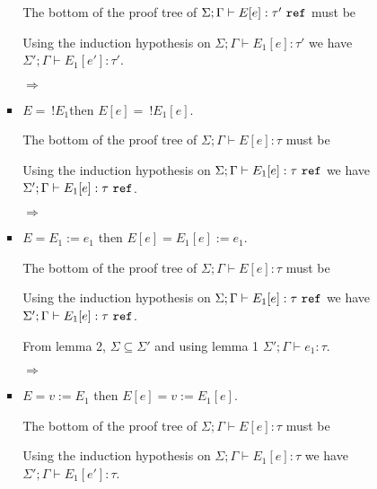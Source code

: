 \begin{enumerate}[(a)]
\begin{enumerate}[i.]
\begin{itemize}
\begin{itemize}
  The bottom of the proof tree of $\Sigma;\Gamma \vdash E[e] : \tau'~\texttt{ref}$ must be 

  Using the induction hypothesis on $\Sigma;\Gamma \vdash E_1[e] : \tau'$ we have $\Sigma';\Gamma \vdash E_1[e'] : \tau'$.

  $\Rightarrow$
  \item $E =~!E_1$then $E[e] = ~!E_1[e]$.

  The bottom of the proof tree of $\Sigma;\Gamma \vdash E[e] : \tau$ must be 

  Using the induction hypothesis on $\Sigma;\Gamma \vdash E_1[e] : \tau~\texttt{ref}$ we have $\Sigma';\Gamma \vdash E_1[e] : \tau~\texttt{ref}$.

  $\Rightarrow$
  \item $E = E_1 := e_1$ then $E[e] = E_1[e] := e_1$. 

  The bottom of the proof tree of $\Sigma;\Gamma \vdash E[e] : \tau$ must be 

  Using the induction hypothesis on $\Sigma;\Gamma \vdash E_1[e] : \tau~\texttt{ref}$ we have $\Sigma';\Gamma \vdash E_1[e] : \tau~\texttt{ref}$.

  From lemma 2, $\Sigma \subseteq \Sigma'$ and using lemma 1 $\Sigma' ;\Gamma \vdash e_1 : \tau$.

  $\Rightarrow$
  \item $E = v := E_1$ then $E[e] = v := E_1[e]$. 

  The bottom of the proof tree of $\Sigma;\Gamma \vdash E[e] : \tau$ must be 

  Using the induction hypothesis on $\Sigma;\Gamma \vdash E_1[e] : \tau$ we have $\Sigma';\Gamma \vdash E_1[e'] : \tau$.


\end{itemize}
\end{itemize}
\end{enumerate}
\end{enumerate}
